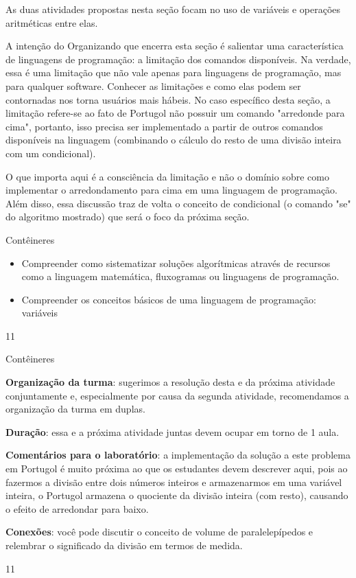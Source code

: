 \label{comp_exp3}
\begin{texto}
{
As duas atividades propostas nesta seção focam no uso de variáveis e operações aritméticas entre elas.

A intenção do Organizando que encerra esta seção é salientar uma característica de linguagens de programação: a limitação dos comandos disponíveis. Na verdade, essa é uma limitação que não vale apenas para linguagens de programação, mas para qualquer software. Conhecer as limitações e como elas podem ser contornadas nos torna usuários mais hábeis. No caso específico desta seção, a limitação refere-se ao fato de Portugol não possuir um comando "arredonde para cima", portanto, isso precisa ser implementado a partir de outros comandos disponíveis na linguagem (combinando o cálculo do resto de uma divisão inteira com um condicional).

O que importa aqui é a consciência da limitação e não o domínio sobre como implementar o arredondamento para cima em uma linguagem de programação. Além disso, essa discussão traz de volta o conceito de condicional (o comando "se"{} do algoritmo mostrado) que será o foco da próxima seção.
}
\end{texto}
\marginpar{\vspace{-1em}}
\begin{objectives}{Contêineres}
{
\begin{itemize}
\item Compreender como sistematizar soluções algorítmicas através de recursos como a linguagem matemática, fluxogramas ou linguagens de programação.

\item Compreender os conceitos básicos de uma linguagem de programação: variáveis
\end{itemize}
}{1}{1}
\end{objectives}
\marginpar{\vspace{-2.5em}}
\begin{sugestions}{Contêineres}
{
\textbf{Organização da turma}: sugerimos a resolução desta e da próxima atividade conjuntamente e, especialmente por causa da segunda atividade, recomendamos a organização da turma em duplas.

\textbf{Duração}: essa e a próxima atividade juntas devem ocupar em torno de 1 aula.

\textbf{Comentários para o laboratório}: a implementação da solução a este problema em Portugol é muito próxima ao que os estudantes devem descrever aqui, pois ao fazermos a divisão entre dois números inteiros e armazenarmos em uma variável inteira, o Portugol armazena o quociente da divisão inteira (com resto), causando o efeito de arredondar para baixo.

\textbf{Conexões}: você pode discutir o conceito de volume de paralelepípedos e relembrar o significado da divisão em termos de medida.
}{1}{1}
\end{sugestions}
